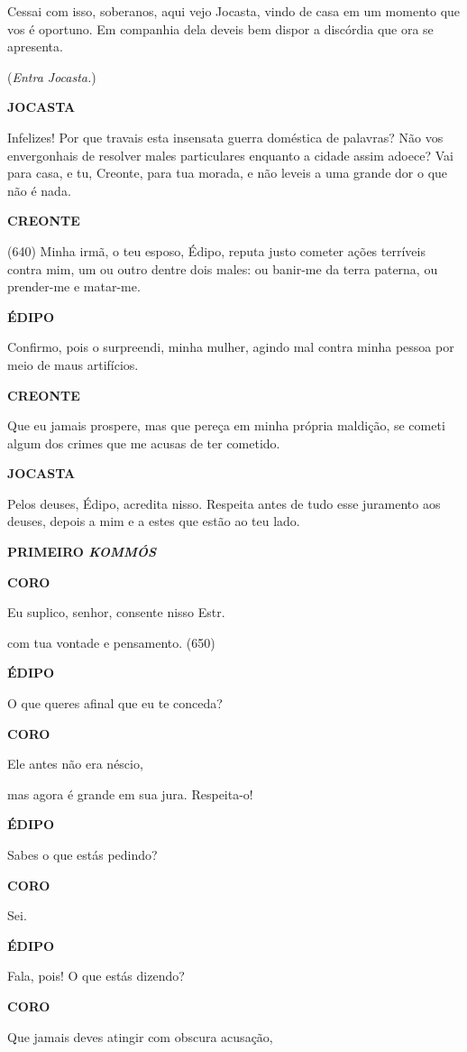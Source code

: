 Cessai com isso, soberanos, aqui vejo Jocasta, vindo de casa em um
momento que vos é oportuno. Em companhia dela deveis bem dispor a
discórdia que ora se apresenta.

(\emph{Entra Jocasta.})

\textbf{JOCASTA}

Infelizes! Por que travais esta insensata guerra doméstica de palavras?
Não vos envergonhais de resolver males particulares enquanto a cidade
assim adoece? Vai para casa, e tu, Creonte, para tua morada, e não
leveis a uma grande dor o que não é nada.

\textbf{CREONTE}

(640) Minha irmã, o teu esposo, Édipo, reputa justo cometer ações
terríveis contra mim, um ou outro dentre dois males: ou banir-me da
terra paterna, ou prender-me e matar-me.

\textbf{ÉDIPO}

Confirmo, pois o surpreendi, minha mulher, agindo mal contra minha
pessoa por meio de maus artifícios.

\textbf{CREONTE}

Que eu jamais prospere, mas que pereça em minha própria maldição, se
cometi algum dos crimes que me acusas de ter cometido.

\textbf{JOCASTA}

Pelos deuses, Édipo, acredita nisso. Respeita antes de tudo esse
juramento aos deuses, depois a mim e a estes que estão ao teu lado.

\textbf{PRIMEIRO \emph{KOMMÓS}}

\textbf{CORO }

Eu suplico, senhor, consente nisso Estr.

com tua vontade e pensamento. (650)

\textbf{ÉDIPO}

O que queres afinal que eu te conceda?

\textbf{CORO}

Ele antes não era néscio,

mas agora é grande em sua jura. Respeita-o!

\textbf{ÉDIPO}

Sabes o que estás pedindo?

\textbf{CORO}

Sei.

\textbf{ÉDIPO}

Fala, pois! O que estás dizendo?

\textbf{CORO}

Que jamais deves atingir com obscura acusação,

